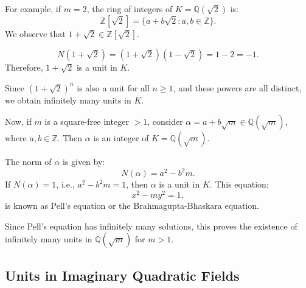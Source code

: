 \documentclass{article}
\begin{document}
\vspace{1em}

For example, if \( m = 2 \), the ring of integers of \( K = \mathbb{Q}(\sqrt{2}) \) is:
\[
\mathbb{Z}[\sqrt{2}] = \{a + b\sqrt{2} : a, b \in \mathbb{Z}\}.
\]
We observe that \( 1 + \sqrt{2} \in \mathbb{Z}[\sqrt{2}] \).

\[
N(1 + \sqrt{2}) = (1 + \sqrt{2})(1 - \sqrt{2}) = 1 - 2 = -1.
\]
Therefore, \( 1 + \sqrt{2} \) is a unit in \( K \).

Since \( (1 + \sqrt{2})^n \) is also a unit for all \( n \geq 1 \), and these powers are all distinct, we obtain infinitely many units in \( K \).

\vspace{1em}

Now, if \( m \) is a square-free integer \( > 1 \), consider \( \alpha = a + b \sqrt{m} \in \mathbb{Q}(\sqrt{m}) \), where \( a, b \in \mathbb{Z} \). Then \( \alpha \) is an integer of \( K = \mathbb{Q}(\sqrt{m}) \).

The norm of \( \alpha \) is given by:
\[
N(\alpha) = a^2 - b^2m.
\]
If \( N(\alpha) = 1 \), i.e., \( a^2 - b^2m = 1 \), then \( \alpha \) is a unit in \( K \). This equation:
\[
x^2 - my^2 = 1,
\]
is known as Pell's equation or the Brahmagupta-Bhaskara equation.

\vspace{1em}

Since Pell's equation has infinitely many solutions, this proves the existence of infinitely many units in \( \mathbb{Q}(\sqrt{m}) \) for \( m > 1 \).

\subsection{Units in Imaginary Quadratic Fields}

\end{document}
